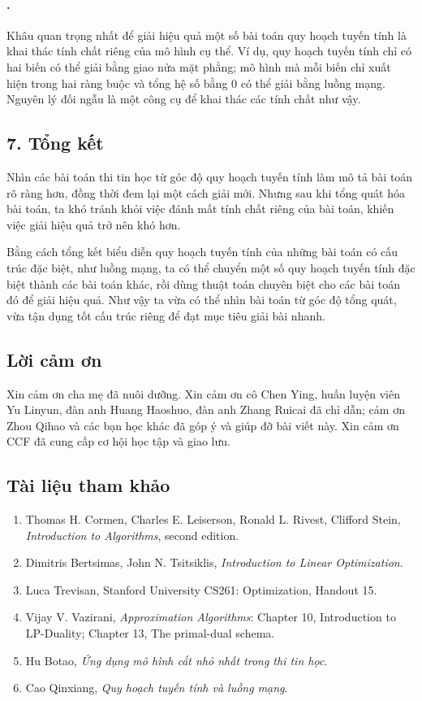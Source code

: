 \documentclass[11pt]{article}
\begin{document}
\paragraph{.}
Khâu quan trọng nhất để giải hiệu quả một số bài toán quy hoạch tuyến tính là
khai thác tính chất riêng của mô hình cụ thể. Ví dụ, quy hoạch tuyến tính chỉ
có hai biến có thể giải bằng giao nửa mặt phẳng; mô hình mà mỗi biến chỉ xuất
hiện trong hai ràng buộc và tổng hệ số bằng \(0\) có thể giải bằng luồng
mạng. Nguyên lý đối ngẫu là một công cụ để khai thác các tính chất như vậy.

\subsection*{7. Tổng kết}

Nhìn các bài toán thi tin học từ góc độ quy hoạch tuyến tính làm mô tả bài
toán rõ ràng hơn, đồng thời đem lại một cách giải mới. Nhưng sau khi tổng
quát hóa bài toán, ta khó tránh khỏi việc đánh mất tính chất riêng của bài
toán, khiến việc giải hiệu quả trở nên khó hơn.

Bằng cách tổng kết biểu diễn quy hoạch tuyến tính của những bài toán có cấu
trúc đặc biệt, như luồng mạng, ta có thể chuyển một số quy hoạch tuyến tính
đặc biệt thành các bài toán khác, rồi dùng thuật toán chuyên biệt cho các bài
toán đó để giải hiệu quả. Như vậy ta vừa có thể nhìn bài toán từ góc độ tổng
quát, vừa tận dụng tốt cấu trúc riêng để đạt mục tiêu giải bài nhanh.

\subsection*{Lời cảm ơn}

Xin cảm ơn cha mẹ đã nuôi dưỡng. Xin cảm ơn cô Chen Ying, huấn luyện viên Yu
Linyun, đàn anh Huang Haoshuo, đàn anh Zhang Ruicai đã chỉ dẫn; cảm ơn Zhou
Qihao và các bạn học khác đã góp ý và giúp đỡ bài viết này. Xin cảm ơn CCF đã
cung cấp cơ hội học tập và giao lưu.

\subsection*{Tài liệu tham khảo}

\begin{enumerate}
  \item Thomas H. Cormen, Charles E. Leiserson, Ronald L. Rivest, Clifford
  Stein, \emph{Introduction to Algorithms}, second edition.
  \item Dimitris Bertsimas, John N. Tsitsiklis, \emph{Introduction to Linear
  Optimization}.
  \item Luca Trevisan, Stanford University CS261: Optimization, Handout 15.
  \item Vijay V. Vazirani, \emph{Approximation Algorithms}: Chapter 10,
  Introduction to LP-Duality; Chapter 13, The primal-dual schema.
  \item Hu Botao, \emph{Ứng dụng mô hình cắt nhỏ nhất trong thi tin học}.
  \item Cao Qinxiang, \emph{Quy hoạch tuyến tính và luồng mạng}.
\end{enumerate}
\end{document}
